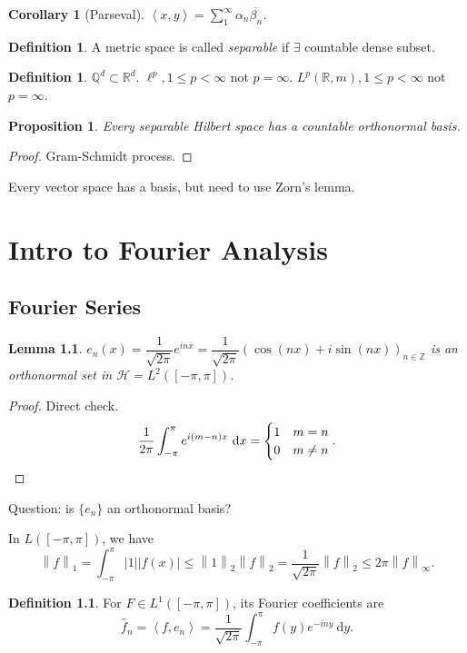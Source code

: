\documentclass{report}
\newcommand{\R}{\mathbb{R}}
\newcommand{\Z}{\mathbb{Z}}
\newcommand{\Q}{\mathbb{Q}}
\newcommand{\cH}{\mathcal{H}}
\newcommand{\df}{\ \mathrm{d}}
\newcommand{\inner}[2]{\left\langle #1, #2\right\rangle}
\newcommand{\norm}[1]{\left\| #1 \right\|}
\newtheorem{corollary}[theorem]{Corollary}
\newtheorem{lemma}[theorem]{Lemma}
\newtheorem{proposition}[theorem]{Proposition}
\theoremstyle{definition}
\newtheorem{definition}[theorem]{Definition}
\theoremstyle{remark}
\begin{document}
\begin{corollary}
	[Parseval] $\inner{x}{y} = \sum_{1}^\infty \alpha_n\overline{\beta_n}$.
\end{corollary}

\begin{definition}
	A metric space is called \emph{separable} if $\exists$ countable dense subset.
\end{definition}
\begin{definition}
	$\Q^d \subset \R^d$. $\ell^p, 1 \leq p < \infty$ not $p = \infty$. $L^p(\R, m), 1 \leq p < \infty$ not $p = \infty$.
\end{definition}
\begin{proposition}
	Every separable Hilbert space has a countable orthonormal basis.
\end{proposition}
\begin{proof}
	Gram-Schmidt process.
\end{proof}
Every vector space has a basis, but need to use Zorn's lemma.


\chapter{Intro to Fourier Analysis}
\section{Fourier Series}
\begin{lemma}
	$e_n(x) = \dfrac{1}{\sqrt{2\pi}}e^{inx} = \dfrac{1}{\sqrt{2\pi}}\left(\cos(nx) + i\sin(nx)\right)_{n \in \Z}$ is an orthonormal set in $\cH = L^2\left([-\pi, \pi]\right)$.
\end{lemma}
\begin{proof}
	Direct check. \[
		\frac{1}{2\pi}\int_{-\pi}^\pi e^{i(m - n)x} \df x = \begin{cases}
			1 & m = n \\
			0 & m \neq n
		\end{cases}. \qedhere
	\]
\end{proof}
Question: is $\{e_n\}$ an orthonormal basis?

In $L\left([-\pi, \pi]\right)$, we have \[
	\norm{f}_1 = \int_{-\pi}^\pi |1||f(x)| \leq \norm{1}_2\norm{f}_2 = \frac{1}{\sqrt{2\pi}}\norm{f}_2 \leq 2\pi\norm{f}_\infty.
\]

\begin{definition}
	For $F \in L^1([-\pi, \pi])$, its Fourier coefficients are \[
		\hat{f}_n = \inner{f}{e_n} = \frac{1}{\sqrt{2\pi}}\int_{-\pi}^\pi f(y)e^{-iny}\df y.	
	\]
\end{definition}
\end{document}
